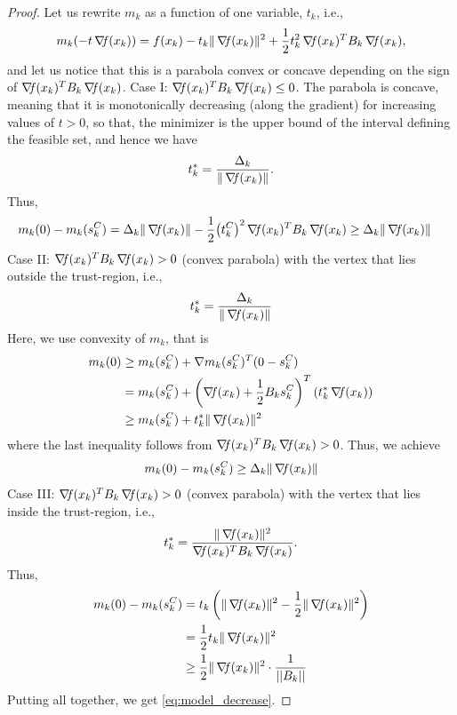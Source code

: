 \documentclass[10pt,a4paper]{article}
\begin{document}
\begin{proof}
	Let us rewrite $m_k$ as a function of one variable, $t_k$, i.e., 
	$$m_k(-t \operatorname*{\mathit{\nabla \!f}}(x_k))=f(x_k) -t_k \|\operatorname*{\mathit{\nabla \!f}}(x_k)\|^2 + \frac{1}{2}t_k^2\operatorname*{\mathit{\nabla \!f}}(x_k)^T B_k\operatorname*{\mathit{\nabla \!f}}(x_k),$$
	and let us notice that this is a parabola convex or concave depending on the sign of $\operatorname*{\mathit{\nabla \!f}}(x_k)^T B_k\operatorname*{\mathit{\nabla \!f}}(x_k)$. 
	Case I: $\operatorname*{\mathit{\nabla \!f}}(x_k)^T B_k \operatorname*{\mathit{\nabla \!f}}(x_k) \leq 0$. The parabola is concave, meaning that it is monotonically decreasing (along the gradient) for increasing values of $t > 0$, so that, the minimizer is the upper bound of the interval defining the feasible set, and hence we have
	\begin{equation*}
		t^*_k = \frac{\Delta_k}{\|\operatorname*{\mathit{\nabla \!f}}(x_k)\|}.
	\end{equation*}
Thus, 
\begin{align*}
	m_k(0) - m_k(s_k^C) & = \Delta_k \|\operatorname*{\mathit{\nabla \!f}}(x_k)\| - \frac{1}{2}{\left(t_k^C\right)}^2\operatorname*{\mathit{\nabla \!f}}(x_k)^T B_k\operatorname*{\mathit{\nabla \!f}}(x_k) \geq \Delta_k \|\operatorname*{\mathit{\nabla \!f}}(x_k)\|
\end{align*}
	Case II: $\operatorname*{\mathit{\nabla \!f}}(x_k)^T B_k \operatorname*{\mathit{\nabla \!f}}(x_k) > 0$ (convex parabola) with the vertex that lies outside the trust-region, i.e., 
	\begin{equation*}
		t^*_k = \frac{\Delta_k}{\|\operatorname*{\mathit{\nabla \!f}}(x_k)\|}
	\end{equation*}
Here, we use convexity of $m_k$, that is 
\begin{align*}
	 m_k(0) & \geq m_k(s_k^C) + \nabla m_k(s_k^C)^T(0-s_k^C)\\
	 & = m_k(s_k^C) + \left(\operatorname*{\mathit{\nabla \!f}}(x_k)+\frac{1}{2}B_ks_k^C\right)^T(t_k^*\operatorname*{\mathit{\nabla \!f}}(x_k))\\
	 & \geq m_k(s_k^C)+ t_k^* \|\operatorname*{\mathit{\nabla \!f}}(x_k)\|^2
\end{align*}
where the last inequality follows from $\operatorname*{\mathit{\nabla \!f}}(x_k)^T B_k \operatorname*{\mathit{\nabla \!f}}(x_k) > 0$. Thus, we achieve
$$m_k(0) - m_k(s_k^C) \geq \Delta_k \|\operatorname*{\mathit{\nabla \!f}}(x_k)\|$$
Case III: $\operatorname*{\mathit{\nabla \!f}}(x_k)^T B_k \operatorname*{\mathit{\nabla \!f}}(x_k) > 0$ (convex parabola) with the vertex that lies inside the trust-region, i.e., 
$$t^*_k = \frac{\|\operatorname*{\mathit{\nabla \!f}}(x_k)\|^2}{\operatorname*{\mathit{\nabla \!f}}(x_k)^T B_k \operatorname*{\mathit{\nabla \!f}}(x_k)}.$$
Thus, 
\begin{align*}
	m_k(0) - m_k(s_k^C) &=  t_k \left(\|\grad(x_k)\|^2 - \frac{1}{2} \|\grad(x_k)\|^2 \right)\\
	& = \frac{1}{2} t_k \|\grad(x_k)\|^2\\
	&\geq \frac{1}{2} \|\grad(x_k)\|^2 \cdot \frac{1}{||B_k||} %
\end{align*}
Putting all together, we get \eqref{eq:model_decrease}.
\end{proof}
\end{document}
